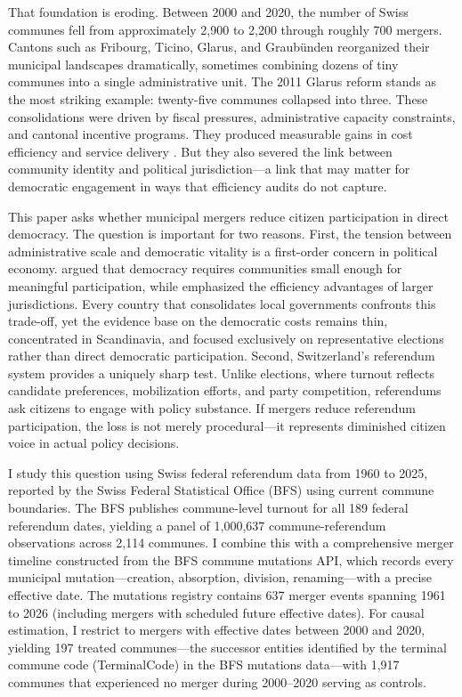 \documentclass[12pt]{article}
\begin{document}
That foundation is eroding. Between 2000 and 2020, the number of Swiss communes fell from approximately 2,900 to 2,200 through roughly 700 mergers. Cantons such as Fribourg, Ticino, Glarus, and Graub\"{u}nden reorganized their municipal landscapes dramatically, sometimes combining dozens of tiny communes into a single administrative unit. The 2011 Glarus reform stands as the most striking example: twenty-five communes collapsed into three. These consolidations were driven by fiscal pressures, administrative capacity constraints, and cantonal incentive programs. They produced measurable gains in cost efficiency and service delivery \citep{steiner2003causes, ladner2009reforms, steiner2012assessing}. But they also severed the link between community identity and political jurisdiction---a link that may matter for democratic engagement in ways that efficiency audits do not capture.

This paper asks whether municipal mergers reduce citizen participation in direct democracy. The question is important for two reasons. First, the tension between administrative scale and democratic vitality is a first-order concern in political economy. \citet{dahl1967size} argued that democracy requires communities small enough for meaningful participation, while \citet{oates1972fiscal} emphasized the efficiency advantages of larger jurisdictions. Every country that consolidates local governments confronts this trade-off, yet the evidence base on the democratic costs remains thin, concentrated in Scandinavia, and focused exclusively on representative elections rather than direct democratic participation. Second, Switzerland's referendum system provides a uniquely sharp test. Unlike elections, where turnout reflects candidate preferences, mobilization efforts, and party competition, referendums ask citizens to engage with policy substance. If mergers reduce referendum participation, the loss is not merely procedural---it represents diminished citizen voice in actual policy decisions.

I study this question using Swiss federal referendum data from 1960 to 2025, reported by the Swiss Federal Statistical Office (BFS) using current commune boundaries. The BFS publishes commune-level turnout for all 189 federal referendum dates, yielding a panel of 1,000,637 commune-referendum observations across 2,114 communes. I combine this with a comprehensive merger timeline constructed from the BFS commune mutations API, which records every municipal mutation---creation, absorption, division, renaming---with a precise effective date. The mutations registry contains 637 merger events spanning 1961 to 2026 (including mergers with scheduled future effective dates). For causal estimation, I restrict to mergers with effective dates between 2000 and 2020, yielding 197 treated communes---the successor entities identified by the terminal commune code (TerminalCode) in the BFS mutations data---with 1,917 communes that experienced no merger during 2000--2020 serving as controls.
\end{document}
